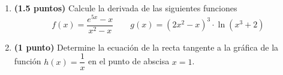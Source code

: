 
\begin{enumerate}[label=\alph*)]
\item \textbf{(1.5 puntos)} Calcule la derivada de las siguientes funciones
\[
f(x)=\frac{e^{5x}-x}{x^2-x}\qquad g(x)=\left(2x^2-x\right)^3\cdot\ln\left(x^3+2\right)
\]
\item \textbf{(1 punto)} Determine la ecuación de la recta tangente a la gráfica de la función $h(x)=\dfrac{1}{x}$ en el punto de abscisa $x=1$.
\end{enumerate}
